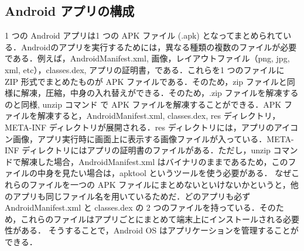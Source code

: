 \subsection{Android アプリの構成}
\label{sec:andrapp}
1 つの Android アプリは1 つの APK ファイル (.apk) となってまとめられている．Androidのアプリを実行するためには，異なる種類の複数のファイルが必要である．例えば，AndroidManifest.xml, 画像，レイアウトファイル（png, jpg, xml, etc），classes.dex, アプリの証明書，である．これらを1 つのファイルに ZIP 形式でまとめたものが APK ファイルである．そのため，zip ファイルと同様に解凍，圧縮，中身の入れ替えができる．そのため，.zip ファイルを解凍するのと同様, unzip コマンド で APK ファイルを解凍することができる．APK ファイルを解凍すると，AndroidManifest.xml, classes.dex, res ディレクトリ，META-INF ディレクトリが展開される．res ディレクトリには，アプリのアイコン画像，アプリ実行時に画面上に表示する画像ファイルが入っている．META-INF ディレクトリにはアプリの証明書のファイルがある．ただし，unzip コマンドで解凍した場合，AndroidManifest.xml はバイナリのままであるため，このファイルの中身を見たい場合は，apktool \cite{apktool} というツールを使う必要がある．
なぜこれらのファイルを一つの APK ファイルにまとめないといけないかというと，他のアプリも同じファイル名を用いているためだ．どのアプリも必ず AndroidManifest.xml と classes.dex の 2 つのファイルを持っている．そのため，これらのファイルはアプリごとにまとめて端末上にインストールされる必要性がある． そうすることで，Android OS はアプリケーションを管理することができる．

